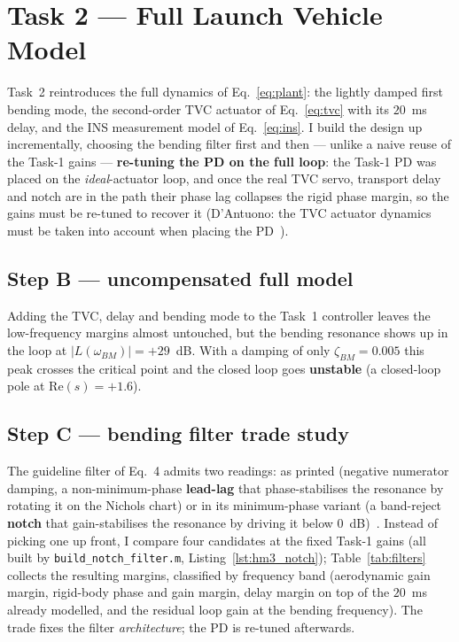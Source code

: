 \documentclass[../main.tex]{subfiles}
\begin{document}
\section{Task 2 --- Full Launch Vehicle Model}\label{sec:task2}

Task~2 reintroduces the full dynamics of Eq.~\eqref{eq:plant}: the lightly damped
first bending mode, the second-order TVC actuator of Eq.~\eqref{eq:tvc} with its
$20$~ms delay, and the INS measurement model of Eq.~\eqref{eq:ins}. I build the
design up incrementally, choosing the bending filter first and then --- unlike a
naive reuse of the Task-1 gains --- \textbf{re-tuning the PD on the full loop}:
the Task-1 PD was placed on the \emph{ideal}-actuator loop, and once the real TVC
servo, transport delay and notch are in the path their phase lag collapses the
rigid phase margin, so the gains must be re-tuned to recover it (D'Antuono: the
TVC actuator dynamics must be taken into account when placing the
PD~\cite{barrowsorr}).

\subsection{Step B --- uncompensated full model}

Adding the TVC, delay and bending mode to the Task~1 controller leaves the
low-frequency margins almost untouched, but the bending resonance shows up in
the loop at $|L(\omega_{BM})| = +29$~dB. With a damping of only
$\zeta_{BM} = 0.005$ this peak crosses the critical point and the closed loop
goes \textbf{unstable} (a closed-loop pole at $\mathrm{Re}(s)=+1.6$).

\subsection{Step C --- bending filter trade study}

The guideline filter of Eq.~4 admits two readings: as printed (negative
numerator damping, a non-minimum-phase \textbf{lead-lag} that phase-stabilises the
resonance by rotating it on the Nichols chart) or in its minimum-phase variant
(a band-reject \textbf{notch} that gain-stabilises the resonance by driving it
below $0$~dB)~\cite[Lecture~18]{dclvnotes}. Instead of picking one up front, I
compare four candidates at the fixed Task-1 gains (all built by
\texttt{build\_notch\_filter.m}, Listing~\ref{lst:hm3_notch});
Table~\ref{tab:filters} collects the resulting margins, classified by frequency
band (aerodynamic gain margin, rigid-body phase and gain margin, delay margin on
top of the $20$~ms already modelled, and the residual loop gain at the bending
frequency). The trade fixes the filter \emph{architecture}; the PD is re-tuned
afterwards.
\end{document}
